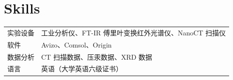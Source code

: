 \documentclass[a4paper,12pt]{article}
\begin{document}
\section{Skills}
\begin{tabularx}{\linewidth}{@{}l X@{}}
实验设备 & \normalsize{工业分析仪、FT-IR 傅里叶变换红外光谱仪、NanoCT 扫描仪} \\
软件 & \normalsize{Avizo、Comsol、Origin} \\
数据分析 & \normalsize{CT 扫描数据、压汞数据、XRD 数据} \\
语言 & \normalsize{英语（大学英语六级证书）}
\end{tabularx}

\vfill
{}
\end{document}
